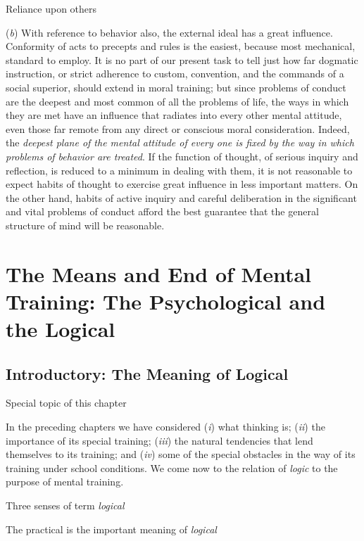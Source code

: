 \documentclass[letterpaper]{book}
\begin{document}
Reliance upon others

(\emph{b}) With reference to behavior also, the external ideal has a
great influence. Conformity of acts to precepts and rules is the
easiest, because most mechanical, standard to employ. It is no part of
our present task to tell just how far dogmatic instruction, or strict
adherence to custom, convention, and the commands of a social superior,
should extend in moral training; but since problems of conduct are the
deepest and most common of all the problems of life, the ways in which
they are met have an influence that radiates into every other mental
attitude, even those far remote from
any
direct or conscious moral consideration. Indeed, the \emph{deepest plane
of the mental attitude of every one is fixed by the way in which
problems of behavior are treated}. If the function of thought, of
serious inquiry and reflection, is reduced to a minimum in dealing with
them, it is not reasonable to expect habits of thought to exercise great
influence in less important matters. On the other hand, habits of active
inquiry and careful deliberation in the significant and vital problems
of conduct afford the best guarantee that the general structure of mind
will be
reasonable.

\chapter{The Means and End of Mental Training: The Psychological and the Logical}

\section{Introductory: The Meaning of Logical}

Special topic of this chapter

In the preceding chapters we have considered (\emph{i}) what thinking
is; (\emph{ii}) the importance of its special training; (\emph{iii}) the
natural tendencies that lend themselves to its training; and (\emph{iv})
some of the special obstacles in the way of its training under school
conditions. We come now to the relation of \emph{logic} to the purpose
of mental training.

Three senses of term \emph{logical}

The practical is the important meaning of \emph{logical}
\end{document}
